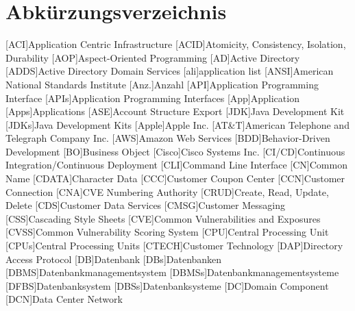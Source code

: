 \chapter*{Abkürzungsverzeichnis}
    \begin{acronym}[]
        [ACI]{Application Centric Infrastructure}
        [ACID]{Atomicity, Consistency, Isolation, Durability}
        [AOP]{Aspect-Oriented Programming}
        [AD]{Active Directory}
        [ADDS]{Active Directory Domain Services}
        [ali]{application list}
        [ANSI]{American National Standards Institute}
        [Anz.]{Anzahl}
        [API]{Application Programming Interface}
        [APIs]{Application Programming Interfaces}
        [App]{Application}
        [Apps]{Applications}
        [ASE]{Account Structure Export}
        [JDK]{Java Development Kit}
        [JDKs]{Java Development Kits}
        [Apple]{Apple Inc.}
        [AT\&T]{American Telephone and Telegraph Company Inc.}
        [AWS]{Amazon Web Services}
        [BDD]{Behavior-Driven Development}
        [BO]{Business Object}
        [Cisco]{Cisco Systems Inc.}
        [CI/CD]{Continuous Integration/Continuous Deployment}
        [CLI]{Command Line Interface}
        [CN]{Common Name}
        [CDATA]{Character Data}
        [CCC]{Customer Coupon Center}
        [CCN]{Customer Connection}
        [CNA]{CVE Numbering Authority}
        [CRUD]{Create, Read, Update, Delete}
        [CDS]{Customer Data Services}
        [CMSG]{Customer Messaging}
        [CSS]{Cascading Style Sheets}
        [CVE]{Common Vulnerabilities and Exposures}
        [CVSS]{Common Vulnerability Scoring System}
        [CPU]{Central Processing Unit}
        [CPUs]{Central Processing Units}
        [CTECH]{Customer Technology}
        [DAP]{Directory Access Protocol}
        [DB]{Datenbank}
        [DBs]{Datenbanken}
        [DBMS]{Datenbankmanagementsystem}
        [DBMSs]{Datenbankmanagementsysteme}
        [DFBS]{Datenbanksystem}
        [DBSs]{Datenbanksysteme}
        [DC]{Domain Component}
        [DCN]{Data Center Network}

\end{acronym}
